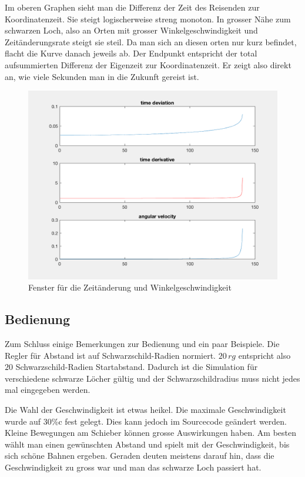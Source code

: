 \begin{refsection}
    Im oberen Graphen sieht man die Differenz der Zeit des Reisenden zur Koordinatenzeit. Sie steigt logischerweise streng monoton. In grosser Nähe zum schwarzen Loch, also an Orten mit grosser Winkelgeschwindigkeit und Zeitänderungsrate steigt sie steil. Da man sich an diesen orten nur kurz befindet, flacht die Kurve danach jeweils ab. Der Endpunkt entspricht der total aufsummierten Differenz der Eigenzeit zur Koordinatenzeit. Er zeigt also direkt an, wie viele Sekunden man in die Zukunft gereist ist.
      \begin{figure}
        \centering
        \includegraphics[width=12cm]{zeitreisen/time.png}
        \caption{Fenster für die Zeitänderung und Winkelgeschwindigkeit}
        \label{skript:zeitreisen:fig:time} 
    \end{figure}
    
    \subsection{Bedienung}
    
    Zum Schluss einige Bemerkungen zur Bedienung und ein paar Beispiele. 
    Die Regler für Abstand ist auf Schwarzschild-Radien normiert. $20\,rg$ entspricht also $20$ Schwarzschild-Radien Startabstand. Dadurch ist die Simulation für verschiedene schwarze Löcher gültig und der Schwarzschildradius muss nicht jedes mal eingegeben werden.
    
    Die Wahl der Geschwindigkeit ist etwas heikel. Die maximale Geschwindigkeit wurde auf 30\%c fest gelegt. Dies kann jedoch im Sourcecode geändert werden. Kleine Bewegungen am Schieber können grosse Auswirkungen haben. Am besten wählt man einen gewünschten Abstand und spielt mit der Geschwindigkeit, bis sich schöne Bahnen ergeben. Geraden deuten meistens darauf hin, dass die Geschwindigkeit zu gross war und man das schwarze Loch passiert hat.
    

\end{refsection}
